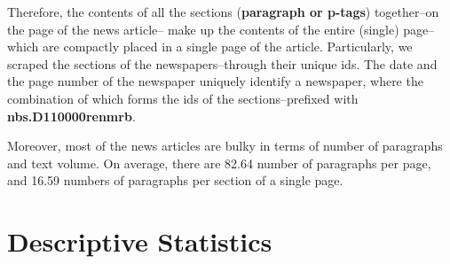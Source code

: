 \documentclass[
  12pt,
]{article}
\begin{document}
Therefore, the contents of all the sections (\textbf{paragraph or p-tags}) together--on the page of the news article-- make up the contents of the entire (single) page--which are compactly placed in a single page of the article. Particularly, we scraped the sections of the newspapers--through their unique ids. The date and the page number of the newspaper uniquely identify a newspaper, where the combination of which forms the ids of the sections--prefixed with \textbf{nbs.D110000renmrb}.

Moreover, most of the news articles are bulky in terms of number of paragraphs and text volume. On average, there are 82.64 number of paragraphs per page, and 16.59 numbers of paragraphs per section of a single page.

\newpage

\hypertarget{descriptive-statistics}{%
\section{Descriptive Statistics}\label{descriptive-statistics}}
\end{document}
